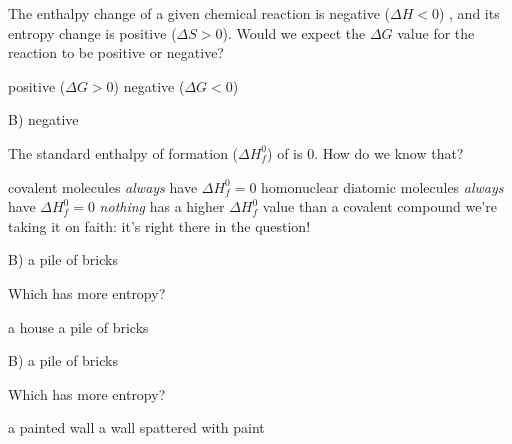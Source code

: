 \documentclass[11pt,addpoints]{exam}   	%
\begin{document}
\begin{questions}
\vspace{0.2in}


\question[5] The enthalpy change of a given chemical reaction is negative ($\Delta H < 0$) , and its entropy change is positive ($\Delta S > 0$).
Would we expect the $\Delta G$ value for the reaction to be positive or negative?

\begin{choices}
\choice positive ($\Delta G > 0$)
\choice negative ($\Delta G < 0$)
\end{choices}

\begin{solution}
B) negative
\end{solution}

\clearpage

\question[5] The standard enthalpy of formation ($\Delta H^{0}_{f}$) of  is $0$. How do we know that?

\begin{choices}
\choice covalent molecules \emph{always} have $\Delta H^{0}_{f} = 0$ 
\choice homonuclear diatomic molecules \emph{always} have $\Delta H^{0}_{f} = 0$ 
\choice \emph{nothing} has a higher $\Delta H^{0}_{f}$ value than a covalent compound
\choice we're taking it on faith: it's right there in the question!
\end{choices}

\begin{solution}
B) a pile of bricks
\end{solution}

\vspace{0.2in}

\question[2] Which has more entropy?

\begin{choices}
\choice a house
\choice a pile of bricks
\end{choices}

\begin{solution}
B) a pile of bricks
\end{solution}

\vspace{0.2in}

\question[2] Which has more entropy?

\begin{choices}
\choice a painted wall
\choice a wall spattered with paint
\end{choices}

\vspace{0.2in}


\end{questions}
\end{document}
